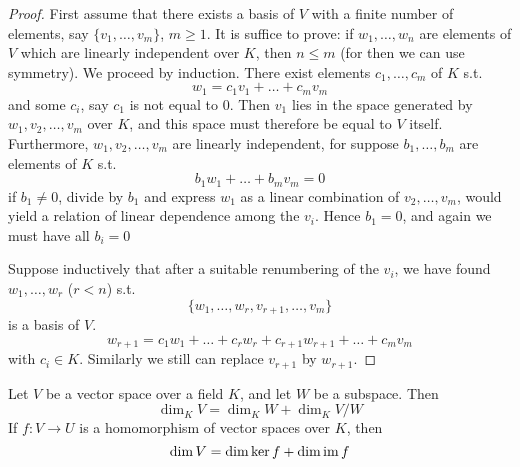 \documentclass[11pt]{article}
\begin{document}
\begin{proof}
First assume that there exists a basis of \(V\) with a finite number of elements,
say \(\{v_1,\dots,v_m\}\), \(m\ge 1\). It is suffice to prove: if \(w_1,\dots,w_n\) are elements of \(V\) which
are linearly independent over \(K\), then \(n\le m\) (for then we can use symmetry). We proceed by
induction. There exist elements \(c_1,\dots,c_m\) of \(K\) s.t.
\begin{equation*}
w_1=c_1v_1+\dots+c_mv_m
\end{equation*}
and some \(c_i\), say \(c_1\) is not equal to 0. Then \(v_1\) lies in the space generated
by \(w_1,v_2,\dots,v_m\) over \(K\), and this space must therefore be equal to \(V\) itself.
Furthermore, \(w_1,v_2,\dots,v_m\) are linearly independent, for suppose \(b_1,\dots,b_m\) are elements
of \(K\) s.t.
\begin{equation*}
b_1w_1+\dots+b_mv_m=0
\end{equation*}
if \(b_1\neq 0\), divide by \(b_1\) and express \(w_1\) as a linear combination of \(v_2,\dots,v_m\), would
yield a relation of linear dependence among the \(v_i\). Hence \(b_1=0\), and again we must have
all \(b_i=0\)

Suppose inductively that after a suitable renumbering of the \(v_i\), we have found \(w_1,\dots,w_r\)
(\(r<n\)) s.t.
\begin{equation*}
\{w_1,\dots,w_r,v_{r+1},\dots,v_m\}
\end{equation*}
is a basis of \(V\).
\begin{equation*}
w_{r+1}=c_1w_1+\dots+c_rw_r+c_{r+1}w_{r+1}+\dots+c_mv_m
\end{equation*}
with \(c_i\in K\). Similarly we still can replace \(v_{r+1}\) by \(w_{r+1}\).
\end{proof}

\begin{theorem}[]
Let \(V\) be a vector space over a field \(K\), and let \(W\) be a subspace. Then
\begin{equation*}
\dim_KV=\dim_KW+\dim_KV/W
\end{equation*}
If \(f:V\to U\) is a homomorphism of vector spaces over \(K\), then
\begin{equation*}
\dim V=\dim\ker f+\dim\operatorname{im} f
\end{equation*}
\end{theorem}
\end{document}
